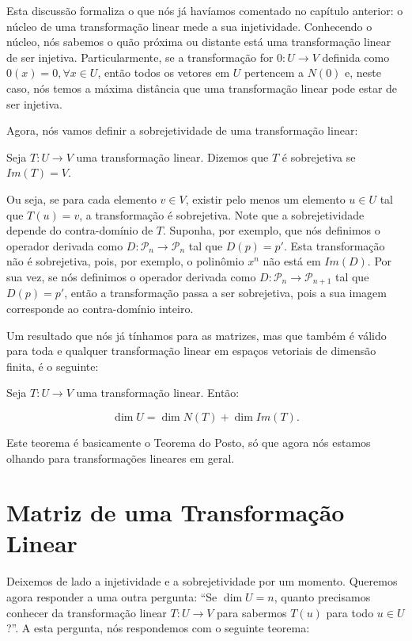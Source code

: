 Esta discussão formaliza o que nós já havíamos comentado no capítulo anterior: o núcleo de uma transformação linear mede a sua injetividade. Conhecendo o núcleo, nós sabemos o quão próxima ou distante está uma transformação linear de ser injetiva. Particularmente, se a transformação for $0:U\to V$ definida como $0(x) = 0, \forall x\in U$, então todos os vetores em $U$ pertencem a $N(0)$ e, neste caso, nós temos a máxima distância que uma transformação linear pode estar de ser injetiva.

Agora, nós vamos definir a sobrejetividade de uma transformação linear:

\begin{Definition}
	Seja $T:U\to V$ uma transformação linear. Dizemos que $T$ é sobrejetiva se $Im(T) = V$.
\end{Definition}

Ou seja, se para cada elemento $v\in V$, existir pelo menos um elemento $u\in U$ tal que $T(u) = v$, a transformação é sobrejetiva. Note que a sobrejetividade depende do contra-domínio de $T$. Suponha, por exemplo, que nós definimos o operador derivada como $D:\mathcal{P}_n\to\mathcal{P}_n$ tal que $D(p) = p'$. Esta transformação não é sobrejetiva, pois, por exemplo, o polinômio $x^n$ não está em $Im(D)$. Por sua vez, se nós definimos o operador derivada como $D:\mathcal{P}_n\to\mathcal{P}_{n + 1}$ tal que $D(p) = p'$, então a transformação passa a ser sobrejetiva, pois a sua imagem corresponde ao contra-domínio inteiro.

Um resultado que nós já tínhamos para as matrizes, mas que também é válido para toda e qualquer transformação linear em espaços vetoriais de dimensão finita, é o seguinte:

\begin{Theorem}
	Seja $T:U\to V$ uma transformação linear. Então:
	
	$$
	\dim U = \dim N(T) + \dim Im(T).
	$$
\end{Theorem}

Este teorema é basicamente o Teorema do Posto, só que agora nós estamos olhando para transformações lineares em geral.


\section{Matriz de uma Transformação Linear}
Deixemos de lado a injetividade e a sobrejetividade por um momento. Queremos agora responder a uma outra pergunta: ``Se $\dim U = n$, quanto precisamos conhecer da transformação linear $T:U\to V$ para sabermos $T(u)$ para todo $u\in U$?''. A esta pergunta, nós respondemos com o seguinte teorema:

